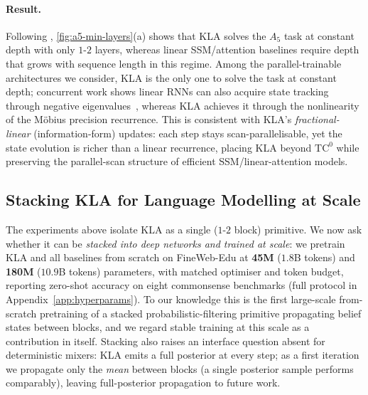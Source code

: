 \documentclass{article}
\begin{document}
\paragraph{Result.}
Following \citet{merrill2024illusion}, \cref{fig:a5-min-layers}(a) shows that \textsc{KLA} solves the $A_5$ task at constant depth with only $1$-$2$ layers, whereas linear SSM/attention baselines require depth that grows with sequence length in this regime.
Among the parallel-trainable architectures we consider, \textsc{KLA} is the only one to solve the task at constant depth; concurrent work shows linear RNNs can also acquire state tracking through negative eigenvalues~\citep{grazzi2024unlocking}, whereas \textsc{KLA} achieves it through the nonlinearity of the M\"{o}bius precision recurrence.
This is consistent with \textsc{KLA}'s \emph{fractional-linear} (information-form) updates: each step stays scan-parallelisable, yet the state evolution is richer than a linear recurrence, placing \textsc{KLA} beyond $\mathrm{TC}^0$ while preserving the parallel-scan structure of efficient SSM/linear-attention models.

\subsection{Stacking \textsc{KLA} for Language Modelling at Scale}
\label{sec:pretraining}

The experiments above isolate \textsc{KLA} as a single ($1$-$2$ block) primitive. We now ask whether it can be \emph{stacked into deep networks and trained at scale}: we pretrain \textsc{KLA} and all baselines from scratch on FineWeb-Edu at \textbf{45M} ($1.8$B tokens) and \textbf{180M} ($10.9$B tokens) parameters, with matched optimiser and token budget, reporting zero-shot accuracy on eight commonsense benchmarks (full protocol in Appendix~\ref{app:hyperparams}). To our knowledge this is the first large-scale from-scratch pretraining of a stacked probabilistic-filtering primitive propagating belief states between blocks, and we regard stable training at this scale as a contribution in itself. Stacking also raises an interface question absent for deterministic mixers: \textsc{KLA} emits a full posterior at every step; as a first iteration we propagate only the \emph{mean} between blocks (a single posterior sample performs comparably), leaving full-posterior propagation to future work.
\end{document}
